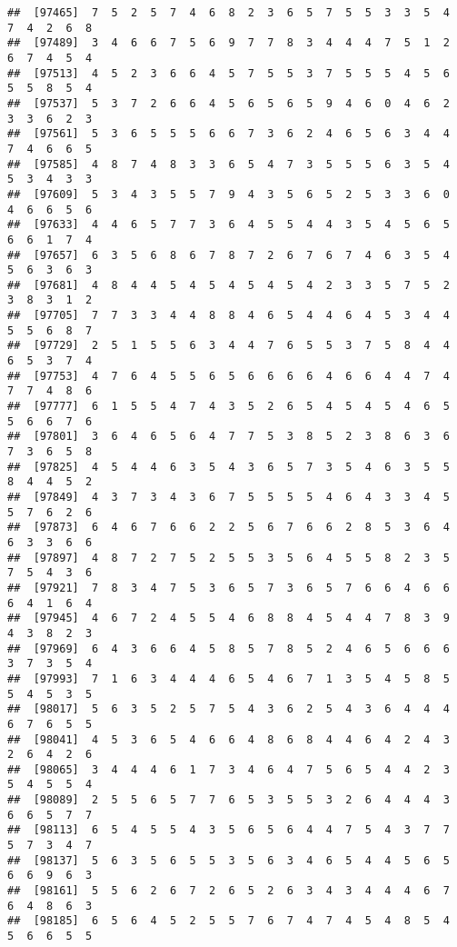 \documentclass[
]{book}
\begin{document}
\begin{verbatim}
##  [97465]  7  5  2  5  7  4  6  8  2  3  6  5  7  5  5  3  3  5  4  7  4  2  6  8
##  [97489]  3  4  6  6  7  5  6  9  7  7  8  3  4  4  4  7  5  1  2  6  7  4  5  4
##  [97513]  4  5  2  3  6  6  4  5  7  5  5  3  7  5  5  5  4  5  6  5  5  8  5  4
##  [97537]  5  3  7  2  6  6  4  5  6  5  6  5  9  4  6  0  4  6  2  3  3  6  2  3
##  [97561]  5  3  6  5  5  5  6  6  7  3  6  2  4  6  5  6  3  4  4  7  4  6  6  5
##  [97585]  4  8  7  4  8  3  3  6  5  4  7  3  5  5  5  6  3  5  4  5  3  4  3  3
##  [97609]  5  3  4  3  5  5  7  9  4  3  5  6  5  2  5  3  3  6  0  4  6  6  5  6
##  [97633]  4  4  6  5  7  7  3  6  4  5  5  4  4  3  5  4  5  6  5  6  6  1  7  4
##  [97657]  6  3  5  6  8  6  7  8  7  2  6  7  6  7  4  6  3  5  4  5  6  3  6  3
##  [97681]  4  8  4  4  5  4  5  4  5  4  5  4  2  3  3  5  7  5  2  3  8  3  1  2
##  [97705]  7  7  3  3  4  4  8  8  4  6  5  4  4  6  4  5  3  4  4  5  5  6  8  7
##  [97729]  2  5  1  5  5  6  3  4  4  7  6  5  5  3  7  5  8  4  4  6  5  3  7  4
##  [97753]  4  7  6  4  5  5  6  5  6  6  6  6  4  6  6  4  4  7  4  7  7  4  8  6
##  [97777]  6  1  5  5  4  7  4  3  5  2  6  5  4  5  4  5  4  6  5  5  6  6  7  6
##  [97801]  3  6  4  6  5  6  4  7  7  5  3  8  5  2  3  8  6  3  6  7  3  6  5  8
##  [97825]  4  5  4  4  6  3  5  4  3  6  5  7  3  5  4  6  3  5  5  8  4  4  5  2
##  [97849]  4  3  7  3  4  3  6  7  5  5  5  5  4  6  4  3  3  4  5  5  7  6  2  6
##  [97873]  6  4  6  7  6  6  2  2  5  6  7  6  6  2  8  5  3  6  4  6  3  3  6  6
##  [97897]  4  8  7  2  7  5  2  5  5  3  5  6  4  5  5  8  2  3  5  7  5  4  3  6
##  [97921]  7  8  3  4  7  5  3  6  5  7  3  6  5  7  6  6  4  6  6  6  4  1  6  4
##  [97945]  4  6  7  2  4  5  5  4  6  8  8  4  5  4  4  7  8  3  9  4  3  8  2  3
##  [97969]  6  4  3  6  6  4  5  8  5  7  8  5  2  4  6  5  6  6  6  3  7  3  5  4
##  [97993]  7  1  6  3  4  4  4  6  5  4  6  7  1  3  5  4  5  8  5  5  4  5  3  5
##  [98017]  5  6  3  5  2  5  7  5  4  3  6  2  5  4  3  6  4  4  4  6  7  6  5  5
##  [98041]  4  5  3  6  5  4  6  6  4  8  6  8  4  4  6  4  2  4  3  2  6  4  2  6
##  [98065]  3  4  4  4  6  1  7  3  4  6  4  7  5  6  5  4  4  2  3  5  4  5  5  4
##  [98089]  2  5  5  6  5  7  7  6  5  3  5  5  3  2  6  4  4  4  3  6  6  5  7  7
##  [98113]  6  5  4  5  5  4  3  5  6  5  6  4  4  7  5  4  3  7  7  5  7  3  4  7
##  [98137]  5  6  3  5  6  5  5  3  5  6  3  4  6  5  4  4  5  6  5  6  6  9  6  3
##  [98161]  5  5  6  2  6  7  2  6  5  2  6  3  4  3  4  4  4  6  7  6  4  8  6  3
##  [98185]  6  5  6  4  5  2  5  5  7  6  7  4  7  4  5  4  8  5  4  5  6  6  5  5

\end{verbatim}
\end{document}
